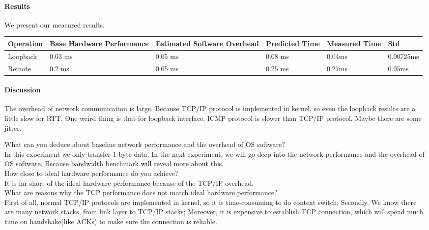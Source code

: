 \paragraph{Results}
We present our measured results.

\begin{center}
\begin{tabular}{| p{2cm} | p{3cm} | p{3cm} | p{2cm} | p{2cm} | p{2cm}}
Operation   & Base Hardware Performance  & Estimated Software Overhead  & Predicted Time  & Measured Time  & Std \\
\hline
Loopback  & 0.03 ms& 0.05 ms& 0.08 ms & 0.04ms & 0.00725ms \\
Remote  & 0.2 ms& 0.05 ms & 0.25 ms & 0.27ms & 0.05ms \\ 
\end{tabular}
\end{center}

\paragraph{Discussion}
The overhead of network communication is large. Because TCP/IP protocol is implemented in kernel, so even the loopback results are a little slow for RTT. One weird thing is that for loopback interface, ICMP protocol is slower than TCP/IP protocol. Maybe there are some jitter.

What can you deduce about baseline network performance and the overhead of OS software?  \\
In this experiment we only transfer 1 byte data. In the next experiment, we will go deep into the network performance and the overhead of OS software. Because bandwidth benchmark will reveal more about this. \\

How close to ideal hardware performance do you achieve? \\
It is far short of the ideal hardware performance because of the TCP/IP overhead.\\


What are reasons why the TCP performance does not match ideal hardware performance?  \\
First of all, normal TCP/IP protocols are implemented in kernel, so it is time-consuming to do context switch;
Secondly, We know there are many network stacks, from link layer to TCP/IP stacks;
Moreover, it is expensive to establish TCP connection, which will spend much time on handshake(like ACKs) to make sure the connection is reliable.

